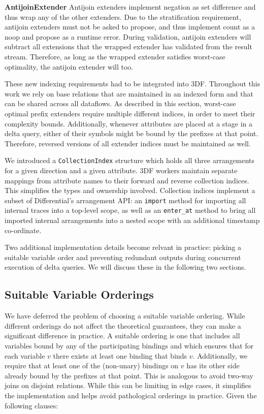 \documentclass[../index.tex]{subfiles}
\begin{document}
\textbf{AntijoinExtender} Antijoin extenders implement negation as set
difference and thus wrap any of the other extenders. Due to the
stratification requirement, antijoin extenders must not be asked to
propose, and thus implement count as a noop and propose as a runtime
error. During validation, antijoin extenders will subtract all
extensions that the wrapped extender has validated from the result
stream. Therefore, as long as the wrapped extender satisfies
worst-case optimality, the antijoin extender will too.

These new indexing requirements had to be integrated into
3DF. Throughout this work we rely on base relations that are
maintained in an indexed form and that can be shared across all
dataflows. As described in this section, worst-case optimal prefix
extenders require multiple different indices, in order to meet their
complexity bounds. Additionally, whenever attributes are placed at a
stage in a delta query, either of their symbols might be bound by the
prefixes at that point. Therefore, reversed versions of all extender
indices must be maintained as well.

We introduced a \texttt{CollectionIndex} structure which holds all
three arrangements for a given direction and a given attribute. 3DF
workers maintain separate mappings from attribute names to their
forward and reverse collection indices. This simplifies the types and
ownership involved. Collection indices implement a subset of
Differential's arrangement API: an \texttt{import} method for
importing all internal traces into a top-level scope, as well as an
\texttt{enter\_at} method to bring all imported internal arrangements
into a nested scope with an additional timestamp co-ordinate.

Two additional implementation details become relvant in practice:
picking a suitable variable order and preventing redundant outputs
during concurrent execution of delta queries. We will discuss these in
the following two sections.

\subsection{Suitable Variable Orderings} \label{impl-variable-order}

We have deferred the problem of choosing a suitable variable
ordering. While different orderings do not affect the theoretical
guarantees, they can make a significant difference in practice. A
suitable ordering is one that includes all variables bound by any of
the participating bindings and which ensures that for each variable
$v$ there exists at least one binding that binds $v$. Additionally, we
require that at least one of the (non-unary) bindings on $v$ has its
other side already bound by the prefixes at that point. This is
analogous to avoid two-way joins on disjoint relations. While this can
be limiting in edge cases, it simplifies the implementation and helps
avoid pathological orderings in practice. Given the following clauses:
\end{document}
